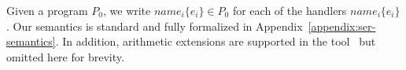 %    
%
%
%
%
%


%

Given a program \(P_0\), we write \(name_i\{e_i\}\in P_0\) for each of the handlers \(name_i\{e_i\}\).
%
Our semantics is standard and fully formalized in Appendix~\ref{appendix:ser-semantics}. 
 In addition, arithmetic extensions are supported in the tool~\cite{ArtifactRepository} but omitted here for brevity.
%
%
    
    
